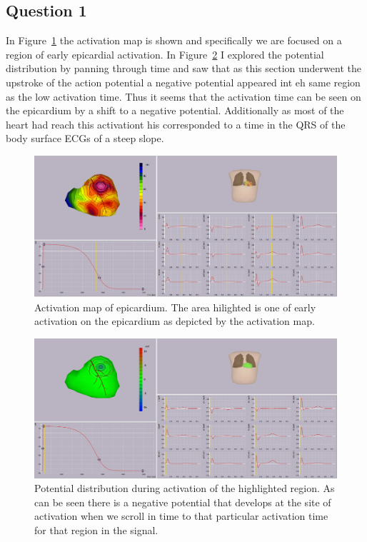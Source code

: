 \documentclass[12pt]{article}
\newcommand{\fig}[1]{Figure~\ref{#1}}
\begin{document}
\subsection{Question 1}
In \fig{fig:ActT} the activation map is shown and specifically we are focused on a region of early epicardial activation. In \fig{fig:ActT_pot} I explored the potential distribution by panning through time and saw that as this section underwent the upstroke of the action potential a negative potential appeared int eh same region as the low activation time. Thus it seems that the activation time can be seen on the epicardium by a shift to a negative potential. Additionally as most of the heart had reach this activationt his corresponded to a time in the QRS of the body surface ECGs of a steep slope.
\begin{figure}[H]
	
	\centering
	\includegraphics[width = .8\textwidth]{Figures/ActTimes.png}
	\caption{Activation map of epicardium. The area hilighted is one of early activation on the epicardium as depicted by the activation map.}
	\label{fig:ActT}
\end{figure}

\begin{figure}[H]
	
	\centering
	\includegraphics[width = .8\textwidth]{Figures/ActTimePotentials.png}
	\caption{Potential distribution during activation of the highlighted region. As can be seen there is a negative potential that develops at the site of activation when we scroll in time to that particular activation time for that region in the signal. }
	\label{fig:ActT_pot}
\end{figure}
\end{document}
